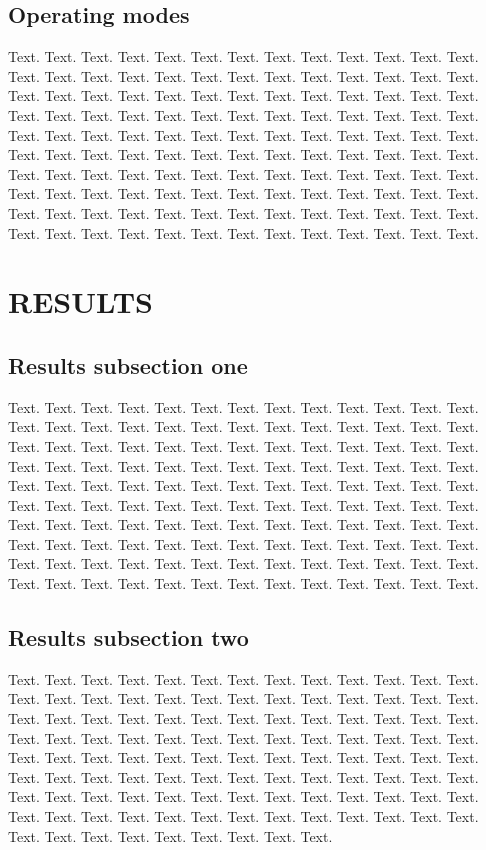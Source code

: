 \documentclass[a4,center,fleqn]{NAR}
\begin{document}
\subsection{Operating modes}

Text. Text. Text. Text. Text. Text. Text. Text. Text. Text. Text.
Text. Text. Text. Text. Text. Text. Text. Text. Text. Text. Text.
Text. Text. Text. Text. Text. Text. Text. Text. Text. Text. Text.
Text. Text. Text. Text. Text. Text. Text. Text. Text. Text. Text.
Text. Text. Text. Text. Text. Text. Text. Text. Text. Text. Text.
Text. Text. Text. Text. Text. Text. Text. Text. Text. Text. Text.
Text. Text. Text. Text. Text. Text. Text. Text. Text. Text. Text.
Text. Text. Text. Text. Text. Text. Text. Text. Text. Text. Text.
Text. Text. Text. Text. Text. Text. Text. Text. Text. Text. Text.
Text. Text. Text. Text. Text. Text. Text. Text. Text. Text. Text.
Text. Text. Text. Text. Text. Text. Text. Text. Text. Text. Text.
Text. Text. Text. Text. Text. Text. Text. Text. Text.

\section{RESULTS}

\subsection{Results subsection one}

Text. Text. Text. Text. Text. Text. Text. Text. Text. Text. Text.
Text. Text. Text. Text. Text. Text. Text. Text. Text. Text. Text.
Text. Text. Text. Text. Text. Text. Text. Text. Text. Text. Text.
Text. Text. Text. Text. Text. Text. Text. Text. Text. Text. Text.
Text. Text. Text. Text. Text. Text. Text. Text. Text. Text. Text.
Text. Text. Text. Text. Text. Text. Text. Text. Text. Text. Text.
Text. Text. Text. Text. Text. Text. Text. Text. Text. Text. Text.
Text. Text. Text. Text. Text. Text. Text. Text. Text. Text. Text.
Text. Text. Text. Text. Text. Text. Text. Text. Text. Text. Text.
Text. Text. Text. Text. Text. Text. Text. Text. Text. Text. Text.
Text. Text. Text. Text. Text. Text. Text. Text. Text. Text. Text.
Text. Text. Text. Text. Text. Text. Text. Text. Text.

\subsection{Results subsection two}

Text. Text. Text. Text. Text. Text. Text. Text. Text. Text. Text.
Text. Text. Text. Text. Text. Text. Text. Text. Text. Text. Text.
Text. Text. Text. Text. Text. Text. Text. Text. Text. Text. Text.
Text. Text. Text. Text. Text. Text. Text. Text. Text. Text. Text.
Text. Text. Text. Text. Text. Text. Text. Text. Text. Text. Text.
Text. Text. Text. Text. Text. Text. Text. Text. Text. Text. Text.
Text. Text. Text. Text. Text. Text. Text. Text. Text. Text. Text.
Text. Text. Text. Text. Text. Text. Text. Text. Text. Text. Text.
Text. Text. Text. Text. Text. Text. Text. Text. Text. Text. Text.
Text. Text. Text. Text. Text. Text. Text. Text. Text. Text. Text.
Text. Text. Text.
\end{document}
